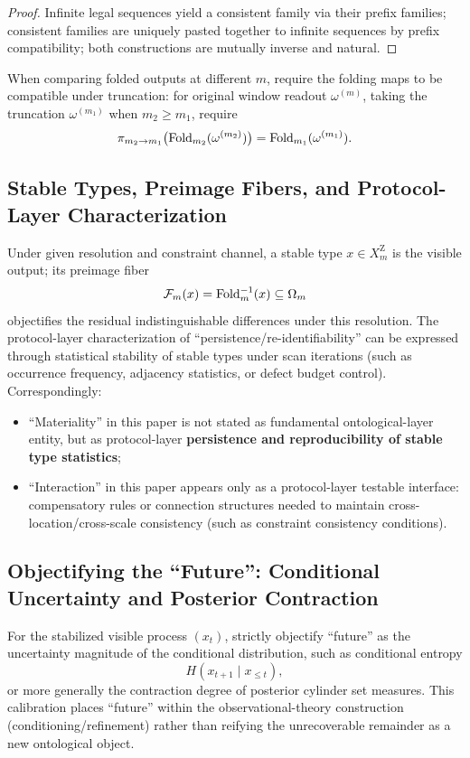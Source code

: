 \begin{proof}
Infinite legal sequences yield a consistent family via their prefix families; consistent families are uniquely pasted together to infinite sequences by prefix compatibility; both constructions are mutually inverse and natural.
\end{proof}

\begin{assumption}\label{assump:static-readout-factorization}
When comparing folded outputs at different $m$, require the folding maps to be compatible under truncation: for original window readout $\omega^{(m)}$, taking the truncation $\omega^{(m_1)}$ when $m_2\ge m_1$, require
\[
\pi_{m_2\to m_1}\bigl(\mathrm{Fold}_{m_2}(\omega^{(m_2)})\bigr)=\mathrm{Fold}_{m_1}(\omega^{(m_1)}).
\]
\end{assumption}

\subsection{Stable Types, Preimage Fibers, and Protocol-Layer Characterization}

Under given resolution and constraint channel, a stable type $x\in X_m^{\mathrm Z}$ is the visible output; its preimage fiber
\[
\mathcal{F}_m(x)=\mathrm{Fold}_m^{-1}(x)\subseteq\Omega_m
\]
objectifies the residual indistinguishable differences under this resolution. The protocol-layer characterization of ``persistence/re-identifiability'' can be expressed through statistical stability of stable types under scan iterations (such as occurrence frequency, adjacency statistics, or defect budget control). Correspondingly:
\begin{itemize}
  \item ``Materiality'' in this paper is not stated as fundamental ontological-layer entity, but as protocol-layer \textbf{persistence and reproducibility of stable type statistics};
  \item ``Interaction'' in this paper appears only as a protocol-layer testable interface: compensatory rules or connection structures needed to maintain cross-location/cross-scale consistency (such as constraint consistency conditions).
\end{itemize}

\subsection{Objectifying the ``Future'': Conditional Uncertainty and Posterior Contraction}

For the stabilized visible process $(x_t)$, strictly objectify ``future'' as the uncertainty magnitude of the conditional distribution, such as conditional entropy
\[
H(x_{t+1}\mid x_{\le t}),
\]
or more generally the contraction degree of posterior cylinder set measures. This calibration places ``future'' within the observational-theory construction (conditioning/refinement) rather than reifying the unrecoverable remainder as a new ontological object.
